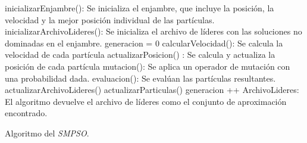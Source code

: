 \begin{algorithm}[hbpt]
    \begin{algorithmic}[1]
    \STATE inicializarEnjambre(): Se inicializa el enjambre, que incluye la posición, la velocidad y la mejor posición individual de las partículas.
    \STATE inicializarArchivoLideres(): Se inicializa el archivo de líderes con las soluciones no dominadas en el enjambre.
    \STATE generacion = 0
        \STATE calcularVelocidad(): Se calcula la velocidad de cada partícula
        \STATE actualizarPosicion() : Se calcula y actualiza la posición de cada partícula
        \STATE mutacion(): Se aplica un operador de mutación con una probabilidad dada.
        \STATE evaluacion(): Se evalúan las partículas resultantes.
        \STATE actualizarArchivoLideres()
        \STATE actualizarParticulas()
        \STATE generacion ++
    \ENDWHILE
    \RETURN ArchivoLideres: El algoritmo devuelve el archivo de líderes como el conjunto de aproximación encontrado.
    \end{algorithmic}
    \caption{Algoritmo del \textit{SMPSO}.}
    \label{smpso_algorithmic}
\end{algorithm} 